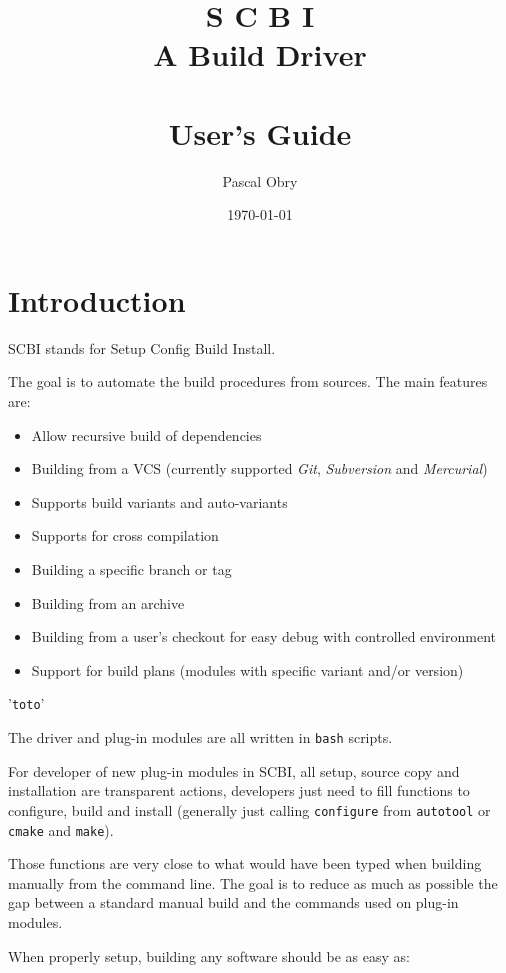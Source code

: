 \documentclass[a4paper,12pt,twoside]{article}
\title{{\Huge S C B I} \\
	{\large  A Build Driver \version} \\
	\hfill \\
	User's Guide}
\author{Pascal Obry}
\date{\today}
\newcommand{\code}[1]{\texttt{#1}}
\renewcommand{\emph}[1]{\textit{#1}}
\newcommand{\file}[1]{'{\texttt{#1}}'}
\let\stdsection\section
\renewcommand\section{\newpage\stdsection}
\begin{document}
\maketitle

%

\tableofcontents


\section{Introduction}

SCBI stands for Setup Config Build Install.

The goal is to automate the build procedures from sources. The main features are:

\begin{itemize}
	\item Allow recursive build of dependencies
	\item Building from a VCS (currently supported \emph{Git}, \emph{Subversion} and \emph{Mercurial})
	\item Supports build variants and auto-variants
	\item Supports for cross compilation
	\item Building a specific branch or tag
	\item Building from an archive
	\item Building from a user's checkout for easy debug with controlled environment
	\item Support for build plans (modules with specific variant and/or version)
\end{itemize}

\file{toto}

The driver and plug-in modules are all written in \code{bash} scripts.

For developer of new plug-in modules in SCBI, all setup, source copy and installation are transparent actions, developers just need to fill functions to configure, build and install (generally just calling \code{configure} from \code{autotool} or \code{cmake} and \code{make}).

Those functions are very close to what would have been typed when building manually from the command line. The goal is to reduce as much as possible the gap between a standard manual build and the commands used on plug-in modules.

When properly setup, building any software should be as easy as:
\end{document}
